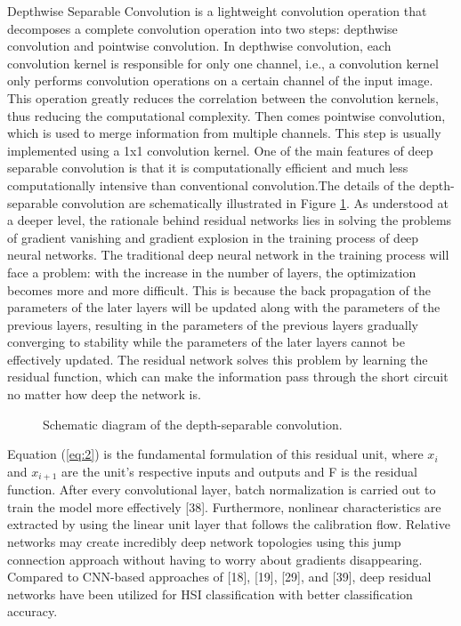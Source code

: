 \documentclass[]{interact}
\theoremstyle{plain}%
\theoremstyle{definition}
\theoremstyle{remark}
\begin{document}
Depthwise Separable Convolution is a lightweight convolution operation that decomposes a complete convolution operation into two steps: depthwise convolution and pointwise convolution. In depthwise convolution, each convolution kernel is responsible for only one channel, i.e., a convolution kernel only performs convolution operations on a certain channel of the input image. This operation greatly reduces the correlation between the convolution kernels, thus reducing the computational complexity. Then comes pointwise convolution, which is used to merge information from multiple channels. This step is usually implemented using a 1x1 convolution kernel. One of the main features of deep separable convolution is that it is computationally efficient and much less computationally intensive than conventional convolution.The details of the depth-separable convolution are schematically illustrated in Figure \ref{fig:2}.
As understood at a deeper level, the rationale behind residual networks lies in solving the problems of gradient vanishing and gradient explosion in the training process of deep neural networks. The traditional deep neural network in the training process will face a problem: with the increase in the number of layers, the optimization becomes more and more difficult. This is because the back propagation of the parameters of the later layers will be updated along with the parameters of the previous layers, resulting in the parameters of the previous layers gradually converging to stability while the parameters of the later layers cannot be effectively updated. The residual network solves this problem by learning the residual function, which can make the information pass through the short circuit no matter how deep the network is.
\begin{figure}[H]
\centering
{}
\caption{Schematic diagram of the depth-separable convolution.}\label{fig:2}
\end{figure}


Equation (\ref{eq:2}) is the fundamental formulation of this residual unit, where $x_{i}$ and $x_{i+1}$ are the unit's respective inputs and outputs and F is the residual function. After every convolutional layer, batch normalization is carried out to train the model more effectively [38]. Furthermore, nonlinear characteristics are extracted by using the linear unit layer that follows the calibration flow. Relative networks may create incredibly deep network topologies using this jump connection approach without having to worry about gradients disappearing. Compared to CNN-based approaches of [18], [19], [29], and [39], deep residual networks have been utilized for HSI classification with better classification accuracy.
\end{document}
